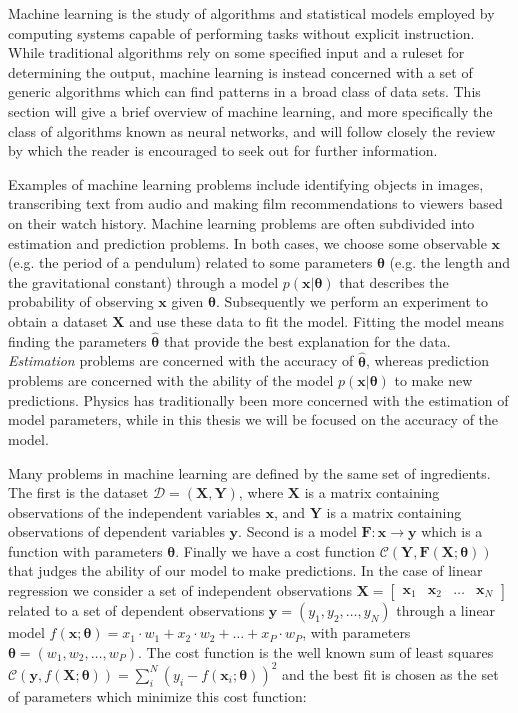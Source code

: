 Machine learning is the study of algorithms and 
statistical models employed by computing systems
capable of performing tasks without explicit instruction.
While traditional algorithms rely on some specified input 
and a ruleset for determining the output, machine learning
is instead concerned with a set of generic algorithms which can find patterns
in a broad class of data sets.
This section will give a brief overview of machine learning,
and more specifically the class of algorithms known as neural networks,
and will follow closely the review by
\parencite[Mehta et al.][pages 1-64]{mehta2019high}
which the reader is encouraged to seek out for further information.
\par
Examples of machine learning problems include identifying objects in images,
transcribing text from audio and making film recommendations to viewers 
based on their watch history.
Machine learning problems are often subdivided into 
estimation and prediction problems.
In both cases, we choose some observable 
$\bm{x}$ (e.g. the period of a pendulum)
related to some parameters $\bm{\theta}$ 
(e.g. the length and the gravitational constant)
through a model $p(\bm{x} \lvert \bm{\theta})$ 
that describes the probability of observing
$\bm{x}$ given $\bm{\theta}$. 
Subsequently we perform an experiment to obtain a dataset
$\bm{X}$ and use these data to fit the model. 
Fitting the model means finding the parameters 
$\hat{\bm{\theta}}$ that provide the best explanation for the data. 
\textit{Estimation} problems are concerned with the accuracy of 
$\hat{\bm{\theta}}$, whereas prediction problems are concerned with 
the ability of the model $p(\bm{x} \lvert \bm{\theta})$
to make new predictions.
Physics has traditionally been more concerned with the estimation 
of model parameters, while in this thesis we will be focused 
on the accuracy of the model.
\par
Many problems in machine learning are defined by the same set of ingredients.
The first is the dataset $\mathcal{D} = (\bm{X}, \bm{Y})$,
where $\bm{X}$ is a matrix containing observations of the 
independent variables $\bm{x}$, and $\bm{Y}$ is a matrix containing
observations of dependent variables $\bm{y}$.
Second is a model $\bm{F}: \bm{x} \rightarrow \bm{y}$
which is a function with parameters $\bm{\theta}$.
Finally we have a cost function
$\mathcal{C}\left(\bm{Y}, \bm{F}\left(\bm{X} ; \bm{\theta}\right)\right)$
that judges the ability of our model to make predictions.
\newline
In the case of linear regression we consider a set of independent observations
$ \bm{X} = 
\begin{bmatrix}
\bm{x}_1 & \bm{x}_2 & \dots & \bm{x}_N
\end{bmatrix}
$
related to a set of dependent observations $\bm{y} = (y_1, y_2, \dots,y_N)$
through a linear model 
$f(\bm{x} ; \bm{\theta}) = 
x_1\cdot w_1 + x_2\cdot w_2 + \dots + x_P\cdot w_P$,
with parameters $\bm{\theta} = (w_1, w_2, \dots,w_P)$. 
The cost function is the well known sum of least squares 
$\mathcal{C}(\bm{y}, f(\bm{X} ; \bm{\theta}))
= \sum_i^N (y_i - f(\bm{x}_i ; \bm{\theta}))^2 $
and the best fit is chosen as the set
of parameters which minimize this cost function: 

